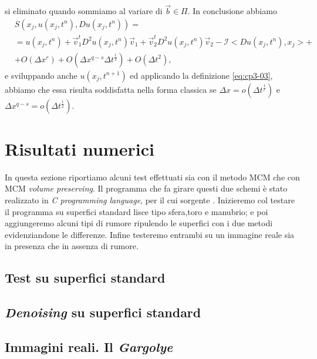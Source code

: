 si eliminato quando sommiamo al variare di $\vec{b}\in\Pi$. In
conclusione abbiamo
\[
\begin{split}
& S(x_j,u(x_j,t^n),Du(x_j,t^n)) = \\
& = u(x_j,t^n) + \vec{v}_1^tD^2u(x_j,t^n)\vec{v}_1 + \vec{v}_2^tD^2u(x_j,t^n)\vec{v}_2 -\mathcal{I}<Du(x_j,t^n),x_j>+ \\
& + O(\Delta x^r) + O(\Delta x^{q-s}\Delta t^{\frac{1}{2}}) + O(\Delta t^2),
\end{split}
\]
e sviluppando anche $u(x_j,t^{n+1})$ ed applicando la definizione
\eqref{eq:cp3-03}, abbiamo che essa risulta soddisfatta nella forma
classica se $\Delta x = o(\Delta t^{\frac{1}{r}})$ e $\Delta x^{q-s}=o(\Delta t^{\frac{1}{2}})$.
%
\section{Risultati numerici}
\label{sec:cp3-sc4}

In questa sezione riportiamo alcuni test effettuati sia con il metodo
MCM che con MCM \emph{volume preserving}. Il programma che fa girare
questi due schemi è stato realizzato in \emph{C programming language},
per il cui sorgente \cite[vedi][]{vpmcm:code}. Inizieremo col testare
il programma su superfici standard lisce tipo sfera,toro e manubrio; e
poi aggiungeremo alcuni tipi di rumore ripulendo le superfici con i
due metodi evidenziandone le differenze. Infine testeremo entrambi su
un immagine reale sia in presenza che in assenza di rumore.

%
\subsection{Test su superfici standard}

%
\subsection{\emph{Denoising} su superfici standard}

%
\subsection{Immagini reali. Il \emph{Gargolye}}
